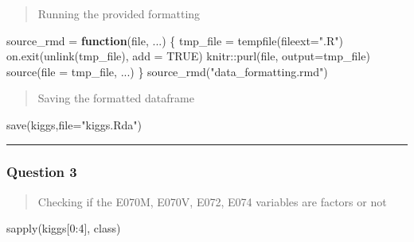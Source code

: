 \documentclass[
]{article}
\newenvironment{Shaded}{\begin{snugshade}}{\end{snugshade}}
\newcommand{\AttributeTok}[1]{\textcolor[rgb]{0.77,0.63,0.00}{#1}}
\newcommand{\ConstantTok}[1]{\textcolor[rgb]{0.00,0.00,0.00}{#1}}
\newcommand{\ControlFlowTok}[1]{\textcolor[rgb]{0.13,0.29,0.53}{\textbf{#1}}}
\newcommand{\DecValTok}[1]{\textcolor[rgb]{0.00,0.00,0.81}{#1}}
\newcommand{\FunctionTok}[1]{\textcolor[rgb]{0.00,0.00,0.00}{#1}}
\newcommand{\NormalTok}[1]{#1}
\newcommand{\OtherTok}[1]{\textcolor[rgb]{0.56,0.35,0.01}{#1}}
\newcommand{\SpecialCharTok}[1]{\textcolor[rgb]{0.00,0.00,0.00}{#1}}
\newcommand{\StringTok}[1]{\textcolor[rgb]{0.31,0.60,0.02}{#1}}
\begin{document}
\begin{quote}
Running the provided formatting
\end{quote}

\begin{Shaded}
\begin{Highlighting}[]
\NormalTok{source\_rmd }\OtherTok{=} \ControlFlowTok{function}\NormalTok{(file, ...) \{}
\NormalTok{  tmp\_file }\OtherTok{=} \FunctionTok{tempfile}\NormalTok{(}\AttributeTok{fileext=}\StringTok{".R"}\NormalTok{)}
  \FunctionTok{on.exit}\NormalTok{(}\FunctionTok{unlink}\NormalTok{(tmp\_file), }\AttributeTok{add =} \ConstantTok{TRUE}\NormalTok{)}
\NormalTok{  knitr}\SpecialCharTok{::}\FunctionTok{purl}\NormalTok{(file, }\AttributeTok{output=}\NormalTok{tmp\_file)}
  \FunctionTok{source}\NormalTok{(}\AttributeTok{file =}\NormalTok{ tmp\_file, ...)}
\NormalTok{\}}
\FunctionTok{source\_rmd}\NormalTok{(}\StringTok{"data\_formatting.rmd"}\NormalTok{)}
\end{Highlighting}
\end{Shaded}

\begin{quote}
Saving the formatted dataframe
\end{quote}

\begin{Shaded}
\begin{Highlighting}[]
\FunctionTok{save}\NormalTok{(kiggs,}\AttributeTok{file=}\StringTok{"kiggs.Rda"}\NormalTok{)}
\end{Highlighting}
\end{Shaded}

\begin{center}\rule{0.5\linewidth}{0.5pt}\end{center}

\hypertarget{question-3}{%
\subsubsection{Question 3}\label{question-3}}

\begin{quote}
Checking if the E070M, E070V, E072, E074 variables are factors or not
\end{quote}

\begin{Shaded}
\begin{Highlighting}[]
\FunctionTok{sapply}\NormalTok{(kiggs[}\DecValTok{0}\SpecialCharTok{:}\DecValTok{4}\NormalTok{], class)}
\end{Highlighting}
\end{Shaded}
\end{document}
